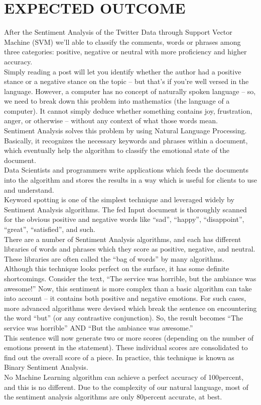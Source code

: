 \documentclass[preprint,12pt]{elsarticle}
\begin{document}
\section{EXPECTED OUTCOME}
\label{S:2}
After the Sentiment Analysis of the Twitter Data through Support Vector Machine (SVM) we'll able to classify the comments, words or phrases among three categories: positive, negative or neutral with more proficiency and higher accuracy.\\
Simply reading a post will let you identify whether the author had a positive stance or a negative stance on the topic – but that’s if you’re well versed in the language. However, a computer has no concept of naturally spoken language – so, we need to break down this problem into mathematics (the language of a computer). It cannot simply deduce whether something contains joy, frustration, anger, or otherwise – without any context of what those words mean.\\
Sentiment Analysis solves this problem by using Natural Language Processing. Basically, it recognizes the necessary keywords and phrases within a document, which eventually help the algorithm to classify the emotional state of the document.\\
Data Scientists and programmers write applications which feeds the documents into the algorithm and stores the results in a way which is useful for clients to use and understand.\\
Keyword spotting is one of the simplest technique and leveraged widely by Sentiment Analysis algorithms. The fed Input document is thoroughly scanned for the obvious positive and negative words like “sad”, “happy”, “disappoint”, “great”, “satisfied”, and such.\\
There are a number of Sentiment Analysis algorithms, and each has different libraries of words and phrases which they score as positive, negative, and neutral. These libraries are often called the “bag of words” by many algorithms.\\
Although this technique looks perfect on the surface, it has some definite shortcomings. Consider the text, “The service was horrible, but the ambiance was awesome!” Now, this sentiment is more complex than a basic algorithm can take into account – it contains both positive and negative emotions. For such cases, more advanced algorithms were devised which break the sentence on encountering the word “but” (or any contrastive conjunction). So, the result becomes “The service was horrible” AND “But the ambiance was awesome.”\\
This sentence will now generate two or more scores (depending on the number of emotions present in the statement). These individual scores are consolidated to find out the overall score of a piece. In practice, this technique is known as Binary Sentiment Analysis.\\
No Machine Learning algorithm can achieve a perfect accuracy of 100percent, and this is no different. Due to the complexity of our natural language, most of the sentiment analysis algorithms are only 80percent accurate, at best.\\
\end{document}
